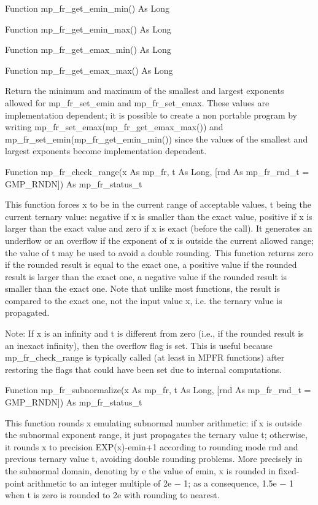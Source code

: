 \vspace{0.3cm}
Function mp\_fr\_get\_emin\_min() As Long 

Function mp\_fr\_get\_emin\_max() As Long 

Function mp\_fr\_get\_emax\_min() As Long 

Function mp\_fr\_get\_emax\_max() As Long 

Return the minimum and maximum of the smallest and largest exponents allowed for mp\_fr\_set\_emin and mp\_fr\_set\_emax. These values are implementation dependent; it is possible to create a non portable program by writing mp\_fr\_set\_emax(mp\_fr\_get\_emax\_max()) and mp\_fr\_set\_emin(mp\_fr\_get\_emin\_min()) since the values of the smallest and largest exponents become implementation dependent. 

\vspace{0.3cm}
Function mp\_fr\_check\_range(x As mp\_fr, t As Long, [rnd As mp\_fr\_rnd\_t = GMP\_RNDN]) As mp\_fr\_status\_t 

This function forces x to be in the current range of acceptable values, t being the current ternary value: negative if x is smaller than the exact value, positive if x is larger than the exact value and zero if x is exact (before the call). It generates an underflow or an overflow if the exponent of x is outside the current allowed range; the value of t may be used to avoid a double rounding. This function returns zero if the rounded result is equal to the exact one, a positive value if the rounded result is larger than the exact one, a negative value if the rounded result is smaller than the exact one. Note that unlike most functions, the result is compared to the exact one, not the input value x, i.e. the ternary value is propagated. 

\vspace{0.3cm}
Note: If x is an infinity and t is different from zero (i.e., if the rounded result is an inexact infinity), then the overflow flag is set. This is useful because mp\_fr\_check\_range is typically called (at least in MPFR functions) after restoring the flags that could have been set due to internal computations. 

\vspace{0.3cm}
Function mp\_fr\_subnormalize(x As mp\_fr, t As Long, [rnd As mp\_fr\_rnd\_t = GMP\_RNDN]) As mp\_fr\_status\_t 

This function rounds x emulating subnormal number arithmetic: if x is outside the subnormal exponent range, it just propagates the ternary value t; otherwise, it rounds x to precision EXP(x)-emin+1 according to rounding mode rnd and previous ternary value t, avoiding double rounding problems. More precisely in the subnormal domain, denoting by e the value of emin, x is rounded in fixed-point arithmetic to an integer multiple of 2e − 1; as a consequence, 1.5e − 1 when t is zero is rounded to 2e with rounding to nearest. 

